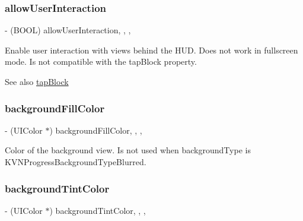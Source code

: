 \subsubsection{\texorpdfstring{allow\+User\+Interaction}{allowUserInteraction}}
{\footnotesize\ttfamily -\/ (B\+O\+OL) allow\+User\+Interaction\hspace{0.3cm}{\ttfamily [read]}, {\ttfamily [write]}, {\ttfamily [nonatomic]}, {\ttfamily [assign]}}

Enable user interaction with views behind the H\+UD. Does not work in fullscreen mode. Is not compatible with the {\ttfamily tap\+Block} property. \begin{DoxySeeAlso}{See also}
\mbox{\hyperlink{interface_k_v_n_progress_configuration_a90c8c76e53b5a62210126e6ba0f233a8}{tap\+Block}} 
\end{DoxySeeAlso}
\mbox{\label{interface_k_v_n_progress_configuration_aa2cbc8cdea47166053ff58f35ca0c6ed}} 
\subsubsection{\texorpdfstring{background\+Fill\+Color}{backgroundFillColor}}
{\footnotesize\ttfamily -\/ (U\+I\+Color $\ast$) background\+Fill\+Color\hspace{0.3cm}{\ttfamily [read]}, {\ttfamily [write]}, {\ttfamily [nonatomic]}, {\ttfamily [strong]}}

Color of the background view. Is not used when background\+Type is K\+V\+N\+Progress\+Background\+Type\+Blurred. \mbox{\label{interface_k_v_n_progress_configuration_a25c413662417daf47f31eb93e7169ce4}} 
\subsubsection{\texorpdfstring{background\+Tint\+Color}{backgroundTintColor}}
{\footnotesize\ttfamily -\/ (U\+I\+Color $\ast$) background\+Tint\+Color\hspace{0.3cm}{\ttfamily [read]}, {\ttfamily [write]}, {\ttfamily [nonatomic]}, {\ttfamily [strong]}}

